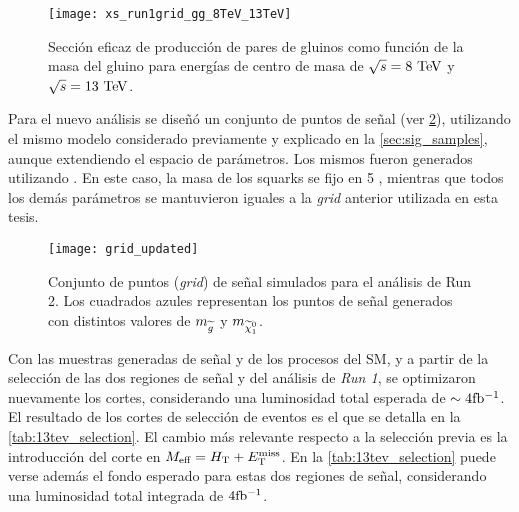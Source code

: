 \begin{figure}[!htb]
  \centering

  \texttt{[image: xs\_run1grid\_gg\_8TeV\_13TeV]}

  \caption{Sección eficaz de producción de pares de gluinos como función de la
    masa del gluino para energías de centro de masa de $\sqrt{s} = 8 \tev$ y
    $\sqrt{s} = 13 \tev$.}
  \label{fig:13tev_xs}

\end{figure}


Para el nuevo análisis se dise\~nó un conjunto de puntos de se\~nal (ver
\cref{fig:13tev_grid}), utilizando el mismo modelo considerado previamente y
explicado en la \cref{sec:sig_samples}, aunque extendiendo el espacio de
parámetros. Los mismos fueron generados utilizando
{\herwigpp}. En este caso, la masa de los squarks se fijo en 5 \tev, mientras
que todos los demás parámetros se mantuvieron iguales a la \emph{grid} anterior
utilizada en esta tesis.


\begin{figure}[!htb]
  \centering

  \texttt{[image: grid\_updated]}

  \caption{Conjunto de puntos (\emph{grid}) de señal simulados para el análisis
    de Run 2. Los cuadrados azules representan los puntos de señal
    generados con distintos valores de $m_{\widetilde{g}}$ y $m_{\ninoone}$.}

  \label{fig:13tev_grid}

\end{figure}


Con las muestras generadas de señal y de los procesos del SM, y
a partir de la selección de las dos regiones de señal {\SRL} y {\SRH} del análisis de \emph{Run 1},
se optimizaron nuevamente los cortes, considerando una luminosidad total esperada de $\sim 4 \mbox{fb$^{-1}$}$.
El resultado de los cortes de selección de eventos es el que se detalla en la \cref{tab:13tev_selection}.
El cambio más relevante respecto a la selección previa es la introducción del corte en $M_\text{eff} = H_{\mathrm{T}} + E_{\mathrm{T}}^{\mathrm{miss}}$.
En la \cref{tab:13tev_selection} puede verse además el fondo esperado para
estas dos regiones de señal, considerando una luminosidad total integrada de $4 \mbox{fb$^{-1}$}$.

